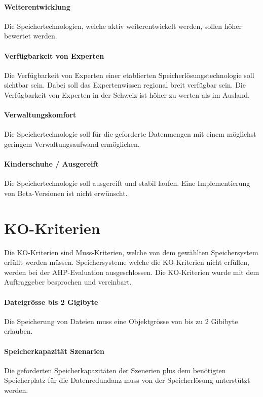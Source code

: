 \paragraph{Weiterentwicklung}\label{Soll-6-2}
Die Speichertechnologien, welche aktiv weiterentwickelt werden, sollen höher bewertet werden.

\paragraph{Verfügbarkeit von Experten}\label{Soll-6-3}
Die Verfügbarkeit von Experten einer etablierten Speicherlösungstechnologie soll sichtbar sein. Dabei soll das Expertenwissen regional breit verfügbar sein. Die Verfügbarkeit von Experten in der Schweiz ist höher zu werten als im Ausland.

\paragraph{Verwaltungskomfort}\label{Soll-6-4}
Die Speichertechnologie soll für die geforderte Datenmengen mit einem möglichst geringem Verwaltungsaufwand ermöglichen.

\paragraph{Kinderschuhe / Ausgereift}\label{Soll-6-5}
Die Speichertechnologie soll ausgereift und stabil laufen. Eine Implementierung von Beta-Versionen ist nicht erwünscht.

\section{KO-Kriterien}
Die KO-Kriterien sind Muss-Kriterien, welche von dem gewählten Speichersystem erfüllt werden müssen. Speichersysteme welche die KO-Kriterien nicht erfüllen, werden bei der AHP-Evaluation ausgeschlossen. Die KO-Kriterien wurde mit dem Auftraggeber besprochen und vereinbart.


\renewcommand\theparagraph{KO-\arabic{paragraph}}
\setcounter{paragraph}{0}

\paragraph{Dateigrösse bis 2 Gigibyte}\label{KO-1}
Die Speicherung von Dateien muss eine Objektgrösse von bis zu 2 Gibibyte erlauben.

\paragraph{Speicherkapazität Szenarien}\label{KO-2}
Die geforderten Speicherkapazitäten der Szenerien plus dem benötigten Speicherplatz für die Datenredundanz muss von der Speicherlösung unterstützt werden.

